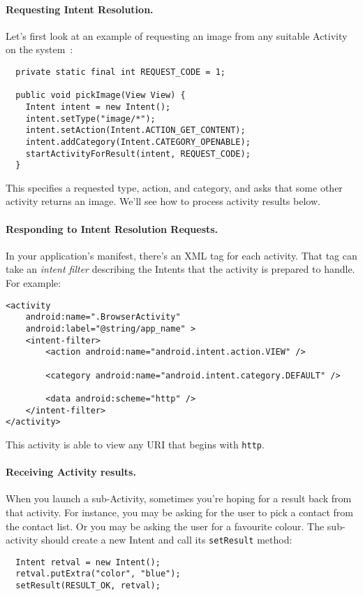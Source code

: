 \paragraph{Requesting Intent Resolution.} Let's first look at an example of requesting an image from any 
suitable Activity on the
system~\cite{vogella}:
{\small 
\begin{verbatim}
  private static final int REQUEST_CODE = 1;

  public void pickImage(View View) {
    Intent intent = new Intent();
    intent.setType("image/*");
    intent.setAction(Intent.ACTION_GET_CONTENT);
    intent.addCategory(Intent.CATEGORY_OPENABLE);
    startActivityForResult(intent, REQUEST_CODE);
  }
\end{verbatim}
}
This specifies a requested type, action, and category, and asks that
some other activity returns an image. We'll see how to process
activity results below.

\paragraph{Responding to Intent Resolution Requests.}
In your application's manifest, there's an XML tag for each activity.
That tag can take an \emph{intent filter} describing the Intents
that the activity is prepared to handle. For example:
{\small 
\begin{verbatim}
<activity
    android:name=".BrowserActivity"
    android:label="@string/app_name" >
    <intent-filter>
        <action android:name="android.intent.action.VIEW" />

        <category android:name="android.intent.category.DEFAULT" />

        <data android:scheme="http" />
    </intent-filter>
</activity>
\end{verbatim}
}
This activity is able to view any URI that begins with {\tt http}.

\paragraph{Receiving Activity results.}
When you launch a sub-Activity, sometimes you're hoping for a result
back from that activity. For instance, you may be asking for the
user to pick a contact from the contact list. Or you may be asking the
user for a favourite colour. The sub-activity should
create a new Intent and call its {\tt setResult} method:

{\scriptsize 
\begin{verbatim}
  Intent retval = new Intent();
  retval.putExtra("color", "blue");
  setResult(RESULT_OK, retval);
\end{verbatim}
}

